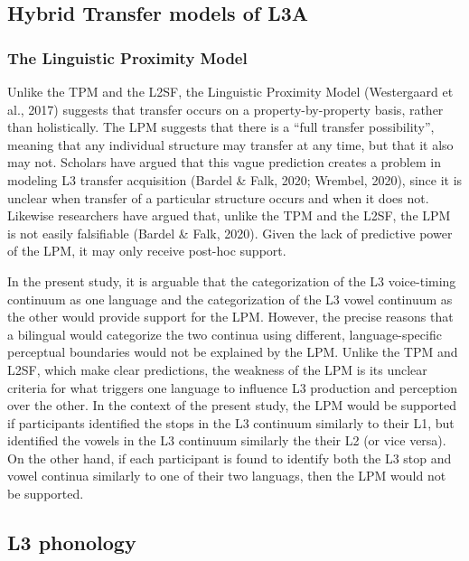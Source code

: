 \documentclass[
  english,
  man]{apa6}
\begin{document}
\hypertarget{hybrid-transfer-models-of-l3a}{%
\subsection{Hybrid Transfer models of L3A}\label{hybrid-transfer-models-of-l3a}}

\hypertarget{the-linguistic-proximity-model}{%
\subsubsection{The Linguistic Proximity Model}\label{the-linguistic-proximity-model}}

Unlike the TPM and the L2SF, the Linguistic Proximity Model (Westergaard et al., 2017) suggests that transfer occurs on a property-by-property basis, rather than holistically.
The LPM suggests that there is a \enquote{full transfer possibility}, meaning that any individual structure may transfer at any time, but that it also may not.
Scholars have argued that this vague prediction creates a problem in modeling L3 transfer acquisition (Bardel \& Falk, 2020; Wrembel, 2020), since it is unclear when transfer of a particular structure occurs and when it does not.
Likewise researchers have argued that, unlike the TPM and the L2SF, the LPM is not easily falsifiable (Bardel \& Falk, 2020).
Given the lack of predictive power of the LPM, it may only receive post-hoc support.

In the present study, it is arguable that the categorization of the L3 voice-timing continuum as one language and the categorization of the L3 vowel continuum as the other would provide support for the LPM. However, the precise reasons that a bilingual would categorize the two continua using different, language-specific perceptual boundaries would not be explained by the LPM. Unlike the TPM and L2SF, which make clear predictions, the weakness of the LPM is its unclear criteria for what triggers one language to influence L3 production and perception over the other. In the context of the present study, the LPM would be supported if participants identified the stops in the L3 continuum similarly to their L1, but identified the vowels in the L3 continuum similarly the their L2 (or vice versa). On the other hand, if each participant is found to identify both the L3 stop and vowel continua similarly to one of their two languags, then the LPM would not be supported.

\hypertarget{l3-phonology}{%
\subsection{L3 phonology}\label{l3-phonology}}
\end{document}
